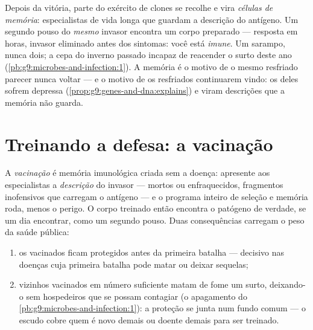 \begin{definition}\label{def:g9:immune-defenses:memory}
Depois da vitória, parte do exército de clones se recolhe e
vira \emph{células de memória}:
especialistas de vida longa que guardam a descrição do
antígeno. Um segundo pouso do \emph{mesmo} invasor encontra
um corpo preparado --- resposta em horas, invasor eliminado
antes dos sintomas: você está \emph{imune}.
Um sarampo, nunca dois; a cepa do inverno passado incapaz de
reacender o surto deste ano
(\cref{pb:g9:microbes-and-infection:1}). A memória é o motivo
de o mesmo resfriado parecer nunca voltar --- e o motivo de
os resfriados continuarem vindo: os  deles sofrem
 depressa (\cref{prop:g9:genes-and-dna:explains}) e
viram descrições que a memória não guarda.
\end{definition}

\section{Treinando a defesa: a vacinação}

\begin{proposition}[A vacinação]\label{prop:g9:immune-defenses:vaccination}
A \emph{vacinação} é memória imunológica
criada sem a doença: apresente aos especialistas a
\emph{descrição} do invasor ---  mortos ou
enfraquecidos, fragmentos inofensivos que carregam o antígeno
--- e o programa inteiro de seleção e memória roda, menos o
perigo. O corpo treinado então encontra o patógeno de
verdade, se um dia encontrar, como um segundo pouso. Duas
consequências carregam o peso da saúde pública:
\begin{enumerate}
  \item os vacinados ficam protegidos antes da primeira
        batalha --- decisivo nas doenças cuja primeira
        batalha pode matar ou deixar sequelas;
  \item vizinhos vacinados em número suficiente matam de
        fome um surto, deixando-o sem hospedeiros que se
        possam contagiar (o apagamento do
        \cref{pb:g9:microbes-and-infection:1}): a proteção se
        junta num fundo comum --- o escudo cobre quem é novo
        demais ou doente demais para ser treinado.
\end{enumerate}
\end{proposition}
\admitted

